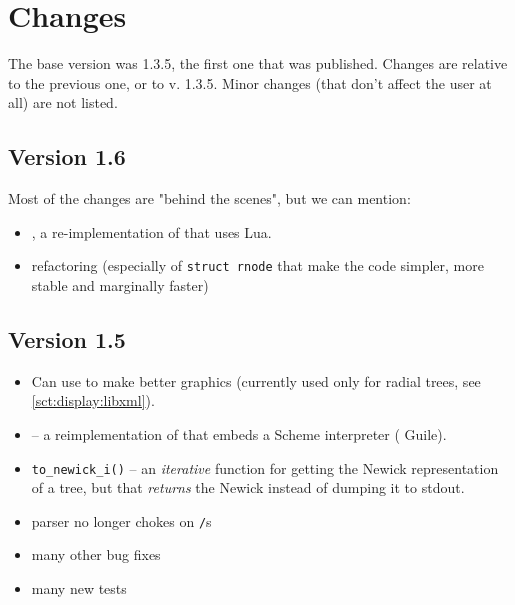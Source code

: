 \chapter{Changes}

The base version was 1.3.5, the first one that was published. Changes are
relative to the previous one, or to v. 1.3.5. Minor changes (that don't affect
the user at all) are not listed.

\section{Version 1.6}

Most of the changes are "behind the scenes", but we can mention:

\begin{itemize}
\item \luaed, a re-implementation of \ed{} that uses Lua.
\item refactoring (especially of \texttt{struct rnode} that make the code
simpler, more stable and marginally faster)
\end{itemize}

\section{Version 1.5}

\begin{itemize}
\item Can use \libxml{} to make better graphics (currently used only for radial
trees, see \ref{sct:display:libxml}).
\item \sched{}-- a reimplementation of \ed{} that embeds a Scheme interpreter
(\gnu{} Guile).
\item \texttt{to\_newick\_i()} -- an \emph{iterative} function for getting the
Newick representation of a tree, but that \emph{returns} the Newick instead of dumping it to stdout.
\item parser no longer chokes on \texttt{/}s
\item many other bug fixes
\item many new tests
\end{itemize}

